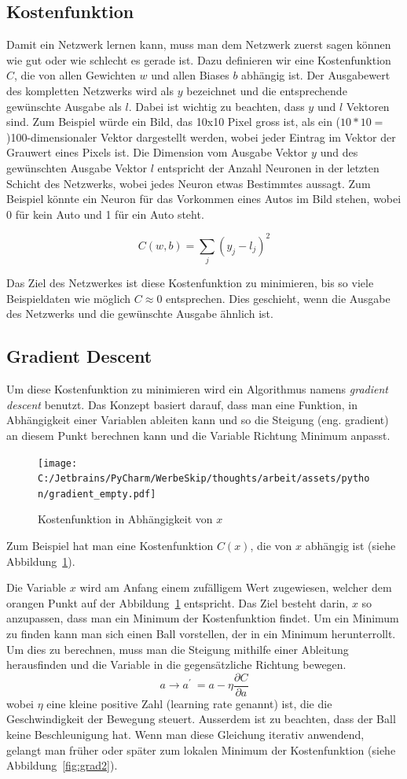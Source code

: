 \documentclass[12pt,a4paper]{report}
\begin{document}
\subsection{Kostenfunktion}
Damit ein Netzwerk lernen kann, muss man dem Netzwerk zuerst sagen können wie gut oder wie schlecht es gerade ist.
Dazu definieren wir eine Kostenfunktion $C$, die von allen Gewichten $w$ und allen Biases $b$ abhängig ist.
Der Ausgabewert des kompletten Netzwerks wird als $y$ bezeichnet und die entsprechende gewünschte Ausgabe als $l$.
Dabei ist wichtig zu beachten, dass $y$ und $l$ Vektoren sind.
Zum Beispiel würde ein Bild, das 10x10 Pixel gross ist, als ein ($10 * 10 =$)100-dimensionaler Vektor dargestellt werden,
wobei jeder Eintrag im Vektor der Grauwert eines Pixels ist.
Die Dimension vom Ausgabe Vektor $y$ und des gewünschten Ausgabe Vektor $l$ entspricht der Anzahl Neuronen in der letzten Schicht des Netzwerks,
wobei jedes Neuron etwas Bestimmtes aussagt.
Zum Beispiel könnte ein Neuron für das Vorkommen eines Autos im Bild stehen, wobei 0 für kein Auto und 1 für ein Auto steht.

\[C(w,b) = \sum_{j}(y_j - l_j)^2\]

Das Ziel des Netzwerkes ist diese Kostenfunktion zu minimieren, bis so viele Beispieldaten wie möglich $C \approx 0$ entsprechen.
Dies geschieht, wenn die Ausgabe des Netzwerks und die gewünschte Ausgabe ähnlich ist.
\subsection{Gradient Descent}
Um diese Kostenfunktion zu minimieren wird ein Algorithmus namens \textit{gradient descent} benutzt.
Das Konzept basiert darauf, dass man eine Funktion, in Abhängigkeit einer Variablen ableiten kann und so die Steigung (eng. gradient)
an diesem Punkt berechnen kann und die Variable Richtung Minimum anpasst.

\begin{figure}[h]%
    \centering
    \texttt{[image: C:/Jetbrains/PyCharm/WerbeSkip/thoughts/arbeit/assets/python/gradient\_empty.pdf]} %
    \caption{Kostenfunktion in Abhängigkeit von $x$}%
    \label{fig:grad1}%
\end{figure}

Zum Beispiel hat man eine Kostenfunktion $C(x)$, die von $x$ abhängig ist (siehe Abbildung~\ref{fig:grad1}).

Die Variable $x$ wird am Anfang einem zufälligem Wert zugewiesen,
welcher dem orangen Punkt auf der Abbildung~\ref{fig:grad1} entspricht.
Das Ziel besteht darin, $x$ so anzupassen,
dass man ein Minimum der Kostenfunktion findet.
Um ein Minimum zu finden kann man sich einen Ball vorstellen, der in ein Minimum herunterrollt.
Um dies zu berechnen, muss man die Steigung mithilfe einer Ableitung herausfinden und die Variable in die
gegensätzliche Richtung bewegen.
\[a \rightarrow a^\prime\ = a - \eta\frac{\partial C}{\partial a}\]
wobei $\eta$ eine kleine positive Zahl (learning rate genannt) ist, die die Geschwindigkeit der Bewegung steuert.
Ausserdem ist zu beachten, dass der Ball keine Beschleunigung hat.
Wenn man diese Gleichung iterativ anwendend, gelangt man früher oder später zum lokalen Minimum der Kostenfunktion (siehe Abbildung~\ref{fig:grad2}).
\end{document}
